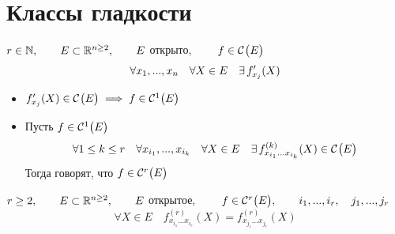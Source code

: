 \section{Классы гладкости}

\begin{definition}[$ \mathcal{C}^r(E) $]
	$ r \in \N, \qquad E \sub \R^{n \ge 2}, \qquad E $ открыто, $ \qquad f \in \Cont{E} $
	$$ \forall x_1, ..., x_n \quad \forall X \in E \quad \exist f_{x_j}'(X) $$
	\begin{itemize}
		\item $ f_{x_j}'(X) \in \Cont{E} \implies f \in \Cont[1]{E} $
		\item Пусть $ f \in \Cont[1]{E} $
		$$ \forall 1 \le k \le r \quad \forall x_{i_1}, ..., x_{i_k} \quad \forall X \in E \quad \exist f_{x_{i_1}...x_{i_k}}^{(k)}(X) \in \Cont{E} $$
		Тогда говорят, что $ f \in \Cont[r]{E} $
	\end{itemize}
\end{definition}

\begin{theorem}
	$ r \ge 2, \qquad E \sub \R^{n \ge 2}, \qquad E $ открытое, $ \qquad f \in \Cont[r]{E}, \qquad i_1, ..., i_r, \quad j_1, ..., j_r $
	$$ \forall X \in E \quad f_{x_{i_1}...x_{i_r}}^{(r)}(X) = f_{x_{j_1}...x_{j_r}}^{(r)}(X) $$
\end{theorem}

